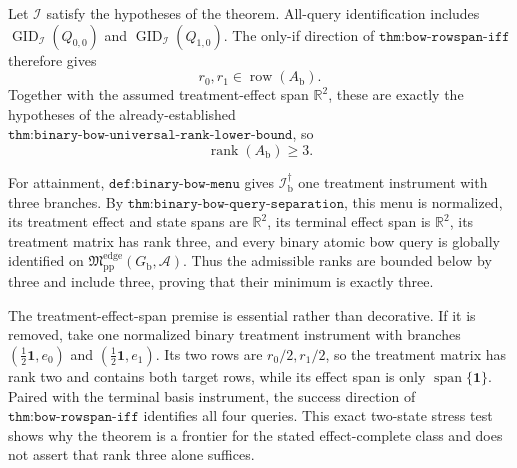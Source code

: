 Let \(\mathcal I\) satisfy the hypotheses of the theorem.  All-query identification includes \(\operatorname{GID}_{\mathcal I}(Q_{0,0})\) and \(\operatorname{GID}_{\mathcal I}(Q_{1,0})\).  The only-if direction of \(\texttt{thm:bow-rowspan-iff}\) therefore gives
\[
r_0,r_1\in\operatorname{row}(A_{\mathrm b}).
\]
Together with the assumed treatment-effect span \(\mathbb R^2\), these are exactly the hypotheses of the already-established \(\texttt{thm:binary-bow-universal-rank-lower-bound}\), so
\[
\operatorname{rank}(A_{\mathrm b})\ge3.
\]

For attainment, \(\texttt{def:binary-bow-menu}\) gives \(\mathcal I_{\mathrm b}^{\dagger}\) one treatment instrument with three branches.  By \(\texttt{thm:binary-bow-query-separation}\), this menu is normalized, its treatment effect and state spans are \(\mathbb R^2\), its terminal effect span is \(\mathbb R^2\), its treatment matrix has rank three, and every binary atomic bow query is globally identified on \(\mathfrak M_{\mathrm{pp}}^{\mathrm{edge}}(G_{\mathrm b},\mathcal A)\).  Thus the admissible ranks are bounded below by three and include three, proving that their minimum is exactly three.

The treatment-effect-span premise is essential rather than decorative.  If it is removed, take one normalized binary treatment instrument with branches \((\tfrac12\mathbf 1,e_0)\) and \((\tfrac12\mathbf 1,e_1)\).  Its two rows are \(r_0/2,r_1/2\), so the treatment matrix has rank two and contains both target rows, while its effect span is only \(\operatorname{span}\{\mathbf 1\}\).  Paired with the terminal basis instrument, the success direction of \(\texttt{thm:bow-rowspan-iff}\) identifies all four queries.  This exact two-state stress test shows why the theorem is a frontier for the stated effect-complete class and does not assert that rank three alone suffices.